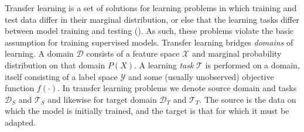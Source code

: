 Transfer learning is a set of solutions for learning problems in which training and test data differ in their marginal distribution, or else that the learning tasks differ between model training and testing (\cite{pan2009survey}). As such, these problems violate the basic assumption for training supervised models. Transfer learning bridges \emph{domains} of learning. A domain $\mathcal{D}$ consists of a feature space $\mathcal{X}$ and marginal probability distribution on that domain $P(X)$. A learning \emph{task} $\mathcal{T}$ is performed on a domain, itself consisting of a label space $\mathcal{Y}$ and some (usually unobserved) objective function $f(\cdot)$. In transfer learning problems we denote source domain and tasks $\mathcal{D}_S$ and $\mathcal{T}_S$ and likewise for target domain $\mathcal{D}_T$ and $\mathcal{T}_T$. The source is the data on which the model is initially trained, and the target is that for which it must be adapted.

